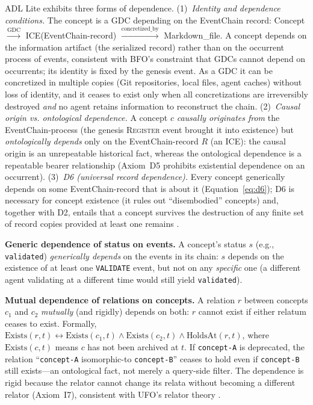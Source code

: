 ADL Lite exhibits three forms of dependence. (1)~\emph{Identity and dependence conditions.} The concept is a GDC depending on the EventChain record: \textsf{Concept} $\xrightarrow{\text{GDC}}$ \textsf{ICE}(EventChain-record) $\xrightarrow{\text{concretized\_by}}$ \textsf{Markdown\_file}. A concept depends on the information artifact (the serialized record) rather than on the occurrent process of events, consistent with BFO's constraint that GDCs cannot depend on occurrents; its identity is fixed by the genesis event. As a GDC it can be concretized in multiple copies (Git repositories, local files, agent caches) without loss of identity, and it ceases to exist only when all concretizations are irreversibly destroyed \emph{and} no agent retains information to reconstruct the chain. (2)~\emph{Causal origin vs. ontological dependence.} A concept $c$ \emph{causally originates from} the EventChain-process (the genesis \textsc{Register} event brought it into existence) but \emph{ontologically depends} only on the EventChain-record $R$ (an ICE): the causal origin is an unrepeatable historical fact, whereas the ontological dependence is a repeatable bearer relationship (Axiom~D5 prohibits existential dependence on an occurrent). (3)~\emph{D6 (universal record dependence).} Every concept generically depends on some EventChain-record that is about it (Equation~\ref{eq:d6}); D6 is necessary for concept existence (it rules out ``disembodied'' concepts) and, together with D2, entails that a concept survives the destruction of any finite set of record copies provided at least one remains \cite{smith2012ontology}.

\textbf{Generic dependence of status on events.} A concept's status $s$ (e.g., \texttt{validated}) \emph{generically depends} on the events in its chain: $s$ depends on the existence of at least one \texttt{VALIDATE} event, but not on any \emph{specific} one (a different agent validating at a different time would still yield \texttt{validated}).

\textbf{Mutual dependence of relations on concepts.} A relation $r$ between concepts $c_1$ and $c_2$ \emph{mutually} (and rigidly) depends on both: $r$ cannot exist if either relatum ceases to exist. Formally, $\text{Exists}(r, t) \leftrightarrow \text{Exists}(c_1, t) \land \text{Exists}(c_2, t) \land \text{HoldsAt}(r, t)$, where $\text{Exists}(c, t)$ means $c$ has not been archived at $t$. If \texttt{concept-A} is deprecated, the relation ``\texttt{concept-A} isomorphic-to \texttt{concept-B}'' ceases to hold even if \texttt{concept-B} still exists---an ontological fact, not merely a query-side filter. The dependence is rigid because the relator cannot change its relata without becoming a different relator (Axiom~I7), consistent with UFO's relator theory \cite{ufo}.

